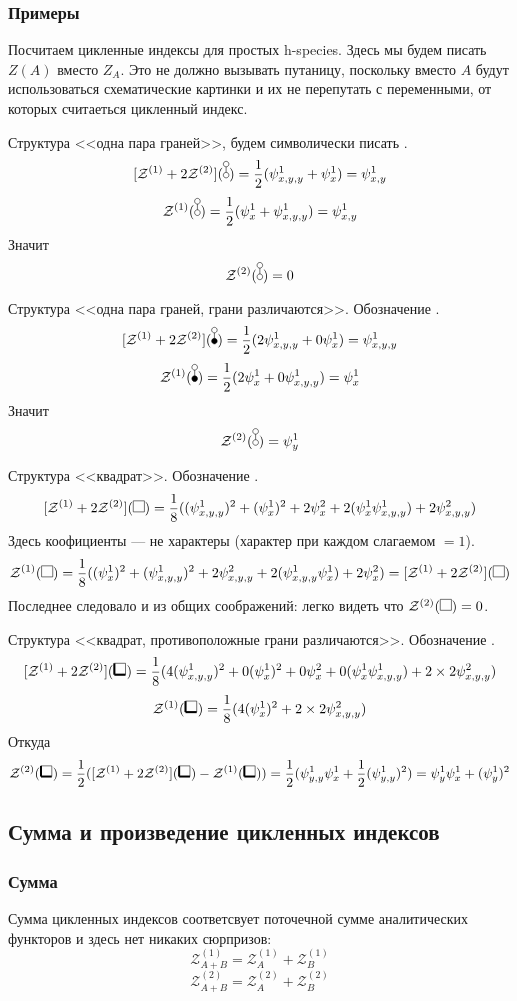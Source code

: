 \subsubsection{Примеры}
Посчитаем цикленные индексы для простых h-species.
Здесь мы будем писать $Z(A)$ вместо $Z_A$. Это не должно вызывать путаницу,
поскольку вместо $A$ будут использоваться схематические картинки и их
не перепутать с переменными, от которых считаеться цикленный индекс. 

Структура <<одна пара граней>>, будем символически писать \dA.
$$
\Zfull(\dA) = \frac{1}{2}(\psi_{x,y,y}^1 + \psi_{x}^1) = \psi_{x,y}^1
$$
$$
\mathcal Z^{(1)}(\dA) = \frac{1}{2}(\psi_{x}^1 + \psi_{x, y, y}^1) = \psi_{x,y}^1
$$
Значит
$$
\mathcal Z^{(2)}(\dA) = 0
$$

Структура <<одна пара граней, грани различаются>>. Обозначение \dB.
$$
\Zfull(\dB) = \frac{1}{2}(2\psi_{x,y,y}^1 + 0\psi_{x}^1) = \psi_{x,y,y}^1
$$
$$
\mathcal Z^{(1)}(\dB) = \frac{1}{2}(2\psi_{x}^1 + 0\psi_{x, y, y}^1) = \psi_{x}^1
$$
Значит
$$
\mathcal Z^{(2)}(\dA) = \psi_{y}^1
$$

Структура <<квадрат>>. Обозначение \dAA.
$$
\Zfull(\dAA) = \frac{1}{8}((\psi_{x,y,y}^1)^2 + (\psi_{x}^1)^2 + 2\psi_{x}^2 +
2(\psi_x^1\psi_{x,y,y}^1) + 2\psi_{x,y,y}^2)
$$
Здесь коофициенты --- не характеры (характер при каждом слагаемом $= 1$).
$$
\mathcal Z^{(1)}(\dAA) = \frac{1}{8}((\psi_{x}^1)^2 + (\psi_{x, y, y}^1)^2 +
2\psi_{x, y, y}^2 + 2(\psi_{x, y, y}^1\psi_{x}^1) + 2\psi_{x}^2) = \Zfull(\dAA)
$$
Последнее следовало и из общих соображений: легко видеть что $\mathcal
Z^{(2)}(\dAA) = 0$.

Структура <<квадрат, противоположные грани различаются>>. Обозначение \dBB.
$$
\Zfull(\dBB) = \frac{1}{8}(4(\psi_{x,y,y}^1)^2 + 0(\psi_{x}^1)^2 + 0\psi_{x}^2
+ 0(\psi_x^1\psi_{x,y,y}^1) + 2\times2\psi_{x,y,y}^2)
$$
$$
\mathcal Z^{(1)}(\dBB) = \frac{1}{8}(4(\psi_{x}^1)^2 + 2\times2\psi_{x,y,y}^2)
$$
Откуда
$$
\mathcal Z^{(2)}(\dBB) = \frac{1}{2}(\Zfull(\dBB) - \mathcal
Z^{(1)}(\dBB)) = \frac{1}{2}(\psi_{y,y}^1\psi_{x}^1 +
\frac{1}{2}(\psi_{y, y}^1)^2) = \psi_{y}^1\psi_{x}^1 + (\psi_{y}^1)^2 $$

\subsection{Сумма и произведение цикленных индексов}
\subsubsection{Сумма}
Сумма цикленных индексов соответсвует поточечной сумме аналитических
функторов и здесь нет никаких сюрпризов:
$$
\mathcal Z_{A + B}^{(1)} = \mathcal Z_A^{(1)} + \mathcal Z_B^{(1)}
$$
$$
\mathcal Z_{A + B}^{(2)} = \mathcal Z_A^{(2)} + \mathcal Z_B^{(2)}
$$
